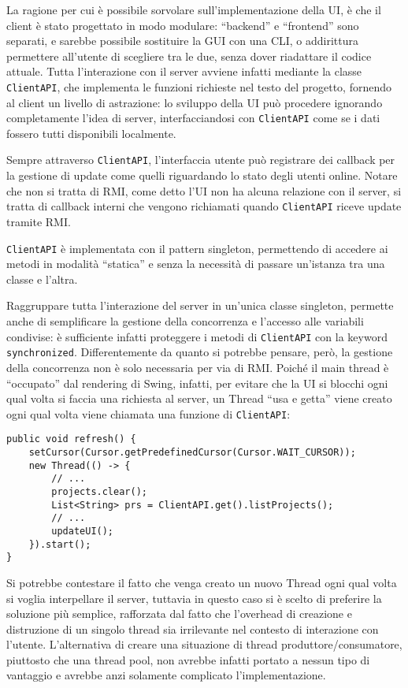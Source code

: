 \documentclass[a4paper,11pt] {article}
\begin{document}
La ragione per cui è possibile sorvolare sull'implementazione della UI, è che il client è stato progettato in modo modulare: ``backend'' e ``frontend'' sono separati, e sarebbe possibile sostituire la GUI con una CLI, o addirittura permettere all'utente di scegliere tra le due, senza dover riadattare il codice attuale.
Tutta l'interazione con il server avviene infatti mediante la classe \texttt{ClientAPI}, che implementa le funzioni richieste nel testo del progetto, fornendo al client un livello di astrazione: lo sviluppo della UI può procedere ignorando completamente l'idea di server, interfacciandosi con \texttt{ClientAPI} come se i dati fossero tutti disponibili localmente.

Sempre attraverso \texttt{ClientAPI}, l'interfaccia utente può registrare dei callback per la gestione di update come quelli riguardando lo stato degli utenti online. Notare che non si tratta di RMI, come detto l'UI non ha alcuna relazione con il server, si tratta di callback interni che vengono richiamati quando \texttt{ClientAPI} riceve update tramite RMI.

\texttt{ClientAPI} è implementata con il pattern singleton, permettendo di accedere ai metodi in modalità ``statica'' e senza la necessità di passare un'istanza tra una classe e l'altra.

Raggruppare tutta l'interazione del server in un'unica classe singleton, permette anche di semplificare la gestione della concorrenza e l'accesso alle variabili condivise: è sufficiente infatti proteggere i metodi di \texttt{ClientAPI} con la keyword \texttt{synchronized}. Differentemente da quanto si potrebbe pensare, però, la gestione della concorrenza non è solo necessaria per via di RMI. Poiché il main thread è ``occupato'' dal rendering di Swing, infatti, per evitare che la UI si blocchi ogni qual volta si faccia una richiesta al server, un Thread ``usa e getta'' viene creato ogni qual volta viene chiamata una funzione di \texttt{ClientAPI}:

\begin{verbatim}
public void refresh() {
	setCursor(Cursor.getPredefinedCursor(Cursor.WAIT_CURSOR));
	new Thread(() -> {
		// ...
		projects.clear();
		List<String> prs = ClientAPI.get().listProjects();
		// ...
		updateUI();
	}).start();
}
\end{verbatim}
Si potrebbe contestare il fatto che venga creato un nuovo Thread ogni qual volta si voglia interpellare il server, tuttavia in questo caso si è scelto di preferire la soluzione più semplice, rafforzata dal fatto che l'overhead di creazione e distruzione di un singolo thread sia irrilevante nel contesto di interazione con l'utente. L'alternativa di creare una situazione di thread produttore/consumatore, piuttosto che una thread pool, non avrebbe infatti portato a nessun tipo di vantaggio e avrebbe anzi solamente complicato l'implementazione.
\end{document}
